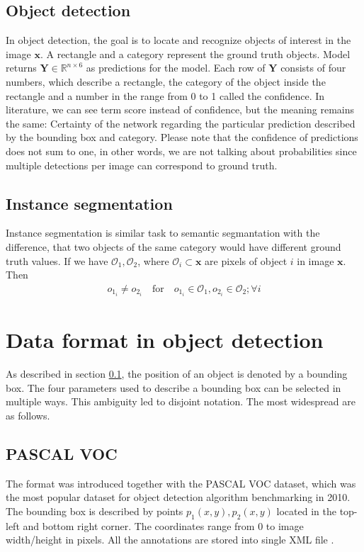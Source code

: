 \subsection{Object detection}
\label{subsec:object_detection}
In object detection, the goal is to locate and recognize objects of interest in the image $\mathbf{x}$. A rectangle and a category represent the ground truth objects. Model returns $\mathbf{Y} \in \mathbb{R}^{n \times 6}$ as predictions for the model. Each row of $\mathbf{Y}$ consists of four numbers, which describe a rectangle, the category of the object inside the rectangle and a number in the range from 0 to 1 called the confidence. In literature, we can see term score instead of confidence, but the meaning remains the same: Certainty of the network regarding the particular prediction described by the bounding box and category. Please note that the confidence of predictions does not sum to one, in other words, we are not talking about probabilities since multiple detections per image can correspond to ground truth.

\subsection{Instance segmentation}
Instance segmentation is similar task to semantic segmantation with the difference, that two objects of the same category would have different ground truth values. If we have $\mathcal{O}_1, \mathcal{O}_2$, where $\mathcal{O}_i \subset \mathbf{x}$ are pixels of object $i$ in image $\mathbf{x}$. Then
\begin{align}
    o_{1_i} \neq o_{2_i} \quad \text{for} \quad o_{1_i} \in \mathcal{O}_1, o_{2_i} \in \mathcal{O}_2;\forall i
\end{align}

\section{Data format in object detection}
As described in section \ref{subsec:object_detection}, the position of an object is denoted by a bounding box.  The four parameters used to describe a bounding box can be selected in multiple ways. This ambiguity led to disjoint notation. The most widespread are as follows.
\subsection{PASCAL VOC}
The format was introduced together with the PASCAL VOC dataset, which was the most popular dataset for object detection algorithm benchmarking in 2010. The bounding box is described by points $p_1(x,y),p_2(x,y)$ located in the top-left and bottom right corner. The coordinates range from 0 to image width/height in pixels. All the annotations are stored into single XML file \cite{Everingham2009,Padilla2021}.
